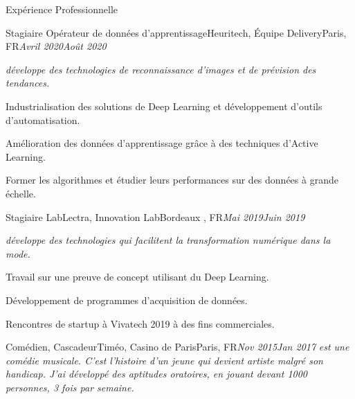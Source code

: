 \documentclass{resume}
\begin{document}
	\begin{rSection}{Expérience Professionnelle}
		\begin{job}{Stagiaire Opérateur de données d'apprentissage}{Heuritech, Équipe Delivery}{Paris, FR}{\em Avril 2020}{\em Août 2020}{
			\textit{\small{développe des technologies de reconnaissance d'images et de prévision des tendances.}}
			\begin{itemize}
			\small{
  				\item Industrialisation des solutions de Deep Learning et développement d'outils d'automatisation.
				\item Amélioration des données d'apprentissage grâce à des techniques d'Active Learning.
				\item Former les algorithmes et étudier leurs performances sur des données à grande échelle.
				}
			\end{itemize}
		}
		\end{job}
		\begin{job}{Stagiaire Lab}{Lectra, Innovation Lab}{Bordeaux , FR}{\em Mai 2019}{\em Juin 2019}{
			\textit{\small{développe des technologies qui facilitent la transformation numérique dans la mode.}}
			\begin{itemize}
			\small{
				  	\item Travail sur une preuve de concept utilisant du Deep Learning.
					\item Développement de programmes d’acquisition de données.
					\item Rencontres de startup à Vivatech 2019 à des fins commerciales.				
			}
			\end{itemize}
		}
		\end{job}

		\begin{job}{Comédien, Cascadeur}{Timéo, Casino de Paris}{Paris, FR}{\em Nov 2015}{\em Jan 2017}{
			\textit{\small{ est une comédie musicale. C'est l'histoire d'un jeune qui devient artiste malgré son handicap. J'ai développé des aptitudes oratoires, en jouant devant 1000 personnes, 3 fois par semaine.}}
		}
		\end{job}
	\end{rSection}
	
\end{document}
